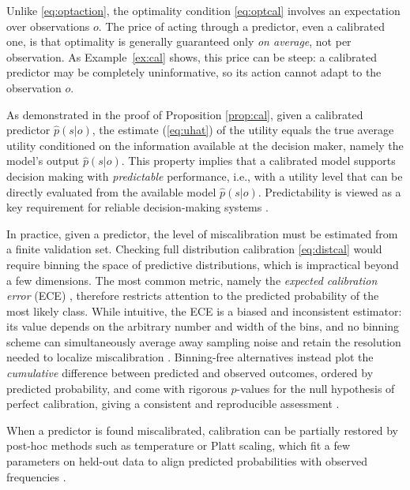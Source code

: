 \documentclass[journal]{IEEEtran}
\theoremstyle{definition}
\theoremstyle{remark}
\begin{document}
Unlike \eqref{eq:optaction}, the optimality condition \eqref{eq:optcal}
involves an expectation over observations $o$. The price of acting through a
predictor, even a calibrated one, is that optimality is generally guaranteed
only \emph{on average}, not per observation. As Example~\ref{ex:cal} shows,
this price can be steep: a calibrated predictor may be completely
uninformative, so its action cannot adapt to the observation $o$.

{ As demonstrated in the proof of Proposition \ref{prop:cal}, given a calibrated predictor $\hat p(s|o)$, the estimate (\ref{eq:uhat}) of the utility equals the true average utility conditioned on the information available at the decision maker, namely the model's output  $\hat p(s|o)$. This property implies that a calibrated model supports decision making with  \emph{predictable} performance, i.e., with a utility level that can be directly evaluated from the available model $\hat p(s|o)$. Predictability is viewed as a key requirement for reliable decision-making systems \cite{rabanser2026towards}. }

In practice, given a predictor, the level of miscalibration must be estimated from a finite validation set.
Checking full distribution calibration \eqref{eq:distcal} would require
binning the space of predictive distributions, which is impractical beyond a
few dimensions. The most common metric, namely the \emph{expected
calibration error} (ECE) \cite{guo2017calibration},  therefore restricts attention to the
predicted probability of the most likely class. While intuitive, the ECE
is a biased and inconsistent estimator: its value depends on the arbitrary
number and width of the bins, and no binning scheme can simultaneously
average away sampling noise and retain the resolution needed to localize
miscalibration \cite{arrietaibarra2022metrics}. Binning-free alternatives
instead plot the \emph{cumulative} difference between predicted and observed
outcomes, ordered by predicted probability, and come with rigorous $p$-values
for the null hypothesis of perfect calibration, giving a consistent and
reproducible assessment \cite{arrietaibarra2022metrics}. 

When a predictor is
found miscalibrated, calibration can be partially restored by post-hoc
methods such as temperature or Platt scaling, which fit a few parameters on
held-out data to align predicted probabilities with observed frequencies
\cite{guo2017calibration,zhao2021calibrating}.

\end{document}
